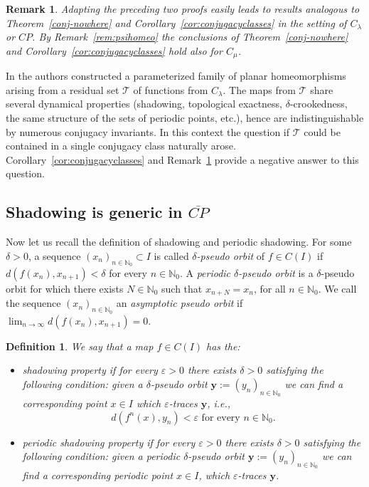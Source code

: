 \documentclass[12pt, a4paper]{amsart}
\newtheorem{remark}[theorem]{Remark}
\newtheorem{definition}[theorem]{Definition}
\def\eps{\varepsilon}
\def\N{{\mathbb N}}
\newcommand{\?}{{\bf ???}}
\def\CP{\overline{CP}}
\begin{document}
\begin{remark}\label{rem:LebegueConjugacyClasses}
Adapting the preceding two proofs easily leads to results analogous to Theorem~\ref{conj-nowhere} and Corollary~\ref{cor:conjugacyclasses} in the setting of $C_{\lambda}$ or $CP$. By Remark~\ref{rem:psihomeo} the conclusions of Theorem~\ref{conj-nowhere} and Corollary~\ref{cor:conjugacyclasses} hold also for $C_{\mu}$. 
\end{remark}


 In \cite{CO} the authors constructed a parameterized family of planar homeomorphisms arising from a residual set $\mathcal{T}$ of functions from $C_{\lambda}$. The maps from $\mathcal{T}$ share several dynamical properties (shadowing, topological exactness, $\delta$-crookedness, the same structure of the sets of periodic points, etc.), hence are  indistinguishable by numerous conjugacy invariants. In this context the question
  if $\mathcal{T}$ could be contained in a single conjugacy class naturally arose.  Corollary~\ref{cor:conjugacyclasses} and Remark~\ref{rem:LebegueConjugacyClasses} provide a negative answer to this question.

\subsection{Shadowing is generic in $\CP$}\label{subsec:shadowing}


Now let us recall the definition of shadowing and periodic shadowing. For some $\delta> 0$, a sequence $(x_n)_{n\in \N_0}\subset I$ is called \emph{$\delta$-pseudo orbit} of $f\in C(I)$ if $d(f(x_n), x_{n+1})< \delta$ for every $n\in \N_0$. A \emph{periodic $\delta$-pseudo orbit} is a $\delta$-pseudo orbit for which there exists $N\in\N_0$ such that $x_{n+N}=x_n$, for all $n\in \N_0$. We call the sequence $(x_n)_{n\in\N_0}$ an \emph{asymptotic pseudo orbit} if $\lim_{n\to\infty} d(f(x_n),x_{n+1})=0$.

\begin{definition}\label{def:shadowing}
We say that a map $f\in C(I)$ has the:
\begin{itemize}
 \item \emph{shadowing property} if for every $\eps > 0$ there exists $\delta >0$ satisfying the following condition: given a $\delta$-pseudo orbit $\mathbf{y}:=(y_n)_{n\in \N_0}$ we can find a corresponding point $x\in I$ which $\eps$-traces $\mathbf{y}$, i.e.,
$$d(f^n(x), y_n)<  \eps \text{ for every } n\in \N_0.$$
\item
\emph{periodic shadowing property} if for every $\eps>0$ there exists $\delta>0$ satisfying the following condition: given a periodic $\delta$-pseudo orbit $\mathbf{y}:=(y_n)_{n\in\N_0}$ we can find a corresponding periodic point $x \in I$, which $\eps$-traces $\mathbf{y}$.
\end{itemize}
\end{definition}
\end{document}
